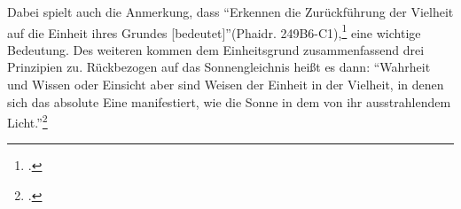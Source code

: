 Dabei spielt auch die Anmerkung, dass \enquote{Erkennen die Zurückführung der Vielheit auf die Einheit ihres Grundes [bedeutet]}(Phaidr. 249B6-C1),\footcite[vgl.][S. 252]{halfwassenaufstieg2006} eine wichtige Bedeutung.
Des weiteren kommen dem Einheitsgrund zusammenfassend drei Prinzipien zu.
Rückbezogen auf das Sonnengleichnis heißt es dann:
\enquote{Wahrheit und Wissen oder Einsicht aber sind Weisen der Einheit in der Vielheit, in denen sich das absolute Eine manifestiert, wie die Sonne in dem von ihr ausstrahlendem Licht.}\footcite[][S. 252]{halfwassenaufstieg2006}

